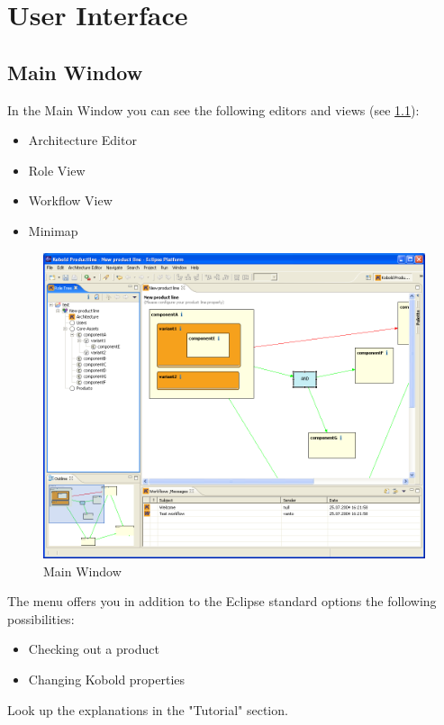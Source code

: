 \chapter{User Interface}

\section{Main Window}
In the Main Window you can see the following editors and views (see \ref{main}):
\begin{itemize}
	\item Architecture Editor
	\item Role View
	\item Workflow View
	\item Minimap
\end{itemize}

\begin{figure}[h!]
\begin{center}
\includegraphics[width=15cm]{main.png}
   \caption{Main Window}
\label{main}
\end{center}
\end{figure}\par

The menu offers you in addition to the Eclipse standard options the following
possibilities:
\begin{itemize}
	\item Checking out a product
	\item Changing Kobold properties
\end{itemize}
Look up the explanations in the "Tutorial" section.

